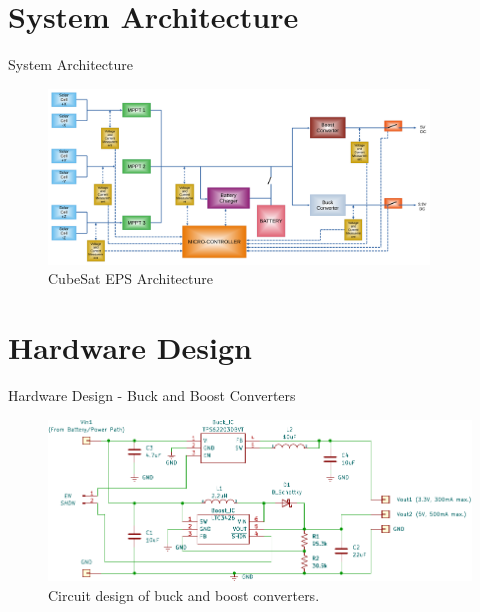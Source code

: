 \documentclass[aspectratio=169]{beamer}
\begin{document}
%	
%	
%
%	
%	



	\section{System Architecture}
	\begin{frame}{System Architecture}
		
		\begin{figure}[h]
			\centering
			\includegraphics[width=0.9\textwidth]{diag/Architecture.pdf}
			\caption{CubeSat EPS Architecture}
			\label{fig:mesh1}
		\end{figure}
		
		
	\end{frame}
	
	\section{Hardware Design}
	\begin{frame}{Hardware Design - Buck and Boost Converters }
		\begin{figure}[h]
			\centering
			\includegraphics[width=1\textwidth]{diag/Buckboost.pdf}
			\caption{Circuit design of buck and boost converters.}
			\label{fig:bubo}
		\end{figure}
	\end{frame}
\end{document}
